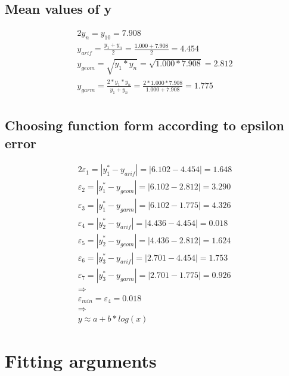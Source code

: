 \documentclass{article}%
\begin{document}
%
\subsection{Mean values of y}%
\label{subsec:Meanvaluesofy}%
\begin{alignat*}{2}%
y_n = y_{10} = {7.908} \\%
y_{arif}
        = \frac {y_1 + y_n} 2
        = \frac {1.000 + 7.908} 2
        = 4.454 \\%
y_{geom}
        = \sqrt {y_1 * y_n}
        = \sqrt {1.000 * 7.908}
        = 2.812 \\%
y_{garm}
        = \frac {2 * y_1 * y_n} {y_1 + y_n}
        = \frac {2 * 1.000 * 7.908} {1.000 + 7.908}
        = 1.775 \\%
\end{alignat*}

%
\subsection{Choosing function form according to epsilon error}%
\label{subsec:Choosingfunctionformaccordingtoepsilonerror}%
\begin{alignat*}{2}%
\varepsilon_1
        = |y_1^* - y_{arif}| = |6.102 - 4.454| = 1.648 \\%
\varepsilon_2
        = |y_1^* - y_{geom}| = |6.102 - 2.812| = 3.290 \\%
\varepsilon_3
        = |y_1^* - y_{garm}| = |6.102 - 1.775| = 4.326 \\%
\varepsilon_4
        = |y_2^* - y_{arif}| = |4.436 - 4.454| = 0.018 \\%
\varepsilon_5
        = |y_2^* - y_{geom}| = |4.436 - 2.812| = 1.624 \\%
\varepsilon_6
        = |y_3^* - y_{arif}| = |2.701 - 4.454| = 1.753 \\%
\varepsilon_7
        = |y_3^* - y_{garm}| = |2.701 - 1.775| = 0.926 \\%
\Rightarrow \\
                    \varepsilon_{min}
                    = \varepsilon_4
                    = 0.018 \\%
\Rightarrow \\
                    y \approx a + b * log(x)%
\end{alignat*}

%
\section{Fitting arguments}%
\label{sec:Fittingarguments}%
\end{document}
